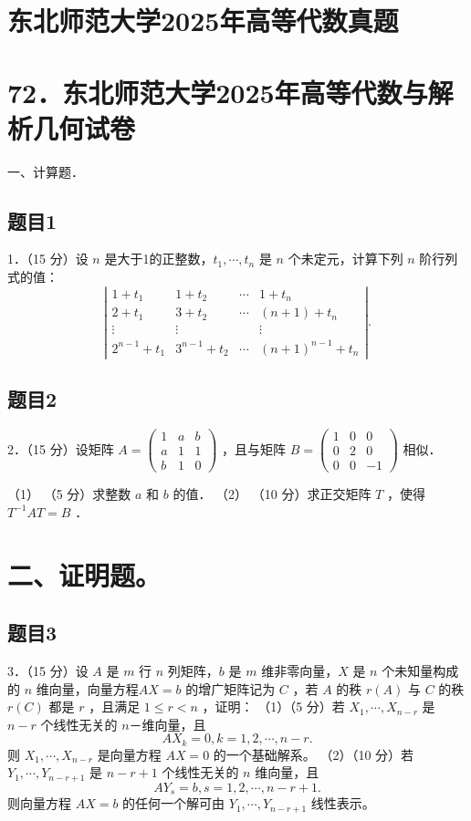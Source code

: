 \documentclass{article}
\begin{document}
\section*{东北师范大学2025年高等代数真题}
\section*{72．东北师范大学2025年高等代数与解析几何试卷}

一、计算题．

\subsection{题目1}
1．（15 分）设 \(n\) 是大于1的正整数，\(t_{1}, \cdots, t_{n}\) 是 \(n\) 个未定元，计算下列 \(n\) 阶行列式的值：
\[
\left|\begin{array}{cccc}
1+t_{1} & 1+t_{2} & \cdots & 1+t_{n} \\
2+t_{1} & 3+t_{2} & \cdots & (n+1)+t_{n} \\
\vdots & \vdots & & \vdots \\
2^{n-1}+t_{1} & 3^{n-1}+t_{2} & \cdots & (n+1)^{n-1}+t_{n}
\end{array}\right| .
\]

\subsection{题目2}
2．（15 分）设矩阵 \(A=\left(\begin{array}{ccc}1 & a & b \\ a & 1 & 1 \\ b & 1 & 0\end{array}\right)\) ，且与矩阵 \(B=\left(\begin{array}{ccc}1 & 0 & 0 \\ 0 & 2 & 0 \\ 0 & 0 & -1\end{array}\right)\) 相似．

（1） （5 分）求整数 \(a\) 和 \(b\) 的值．
（2） （10 分）求正交矩阵 \(T\) ，使得 \(T^{-1} A T=B\) ．
\section*{二、证明题。}

\subsection{题目3}
3．（15 分）设 \(A\) 是 \(m\) 行 \(n\) 列矩阵，\(b\) 是 \(m\) 维非零向量，\(X\) 是 \(n\) 个未知量构成的 \(n\) 维向量，向量方程\(A X=b\) 的增广矩阵记为 \(C\) ，若 \(A\) 的秩 \(r(A)\) 与 \(C\) 的秩 \(r(C)\) 都是 \(r\) ，且满足 \(1 \leq r<n\) ，证明：
（1）（5 分）若 \(X_{1}, \cdots, X_{n-r}\) 是 \(n-r\) 个线性无关的 \(n\)－维向量，且
\[
A X_{k}=0, k=1,2, \cdots, n-r .
\]
则 \(X_{1}, \cdots, X_{n-r}\) 是向量方程 \(A X=0\) 的一个基础解系。
（2）（10 分）若 \(Y_{1}, \cdots, Y_{n-r+1}\) 是 \(n-r+1\) 个线性无关的 \(n\) 维向量，且
\[
A Y_{s}=b, s=1,2, \cdots, n-r+1 .
\]
则向量方程 \(A X=b\) 的任何一个解可由 \(Y_{1}, \cdots, Y_{n-r+1}\) 线性表示。
\end{document}
